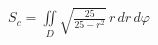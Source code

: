 \documentclass[preview]{standalone}
\begin{document}
\begin{align*}
S_c = \iint\limits_D \sqrt{\frac{25}{25 - r^2}} \, r \, dr \, d\varphi
\end{align*}
\end{document}
